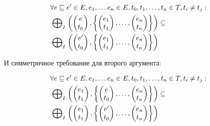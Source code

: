 \begin{equation}
\label{cpa_tm_epp_req_1}
\begin{aligned}
& \forall e \sqsubseteq e' \in E, e_1, \dots e_n \in E, t_0,t_1,\dots,t_n \in T, t_i \neq t_j : \\
& \mathrel{\bigoplus}_I
\left(
\begin{pmatrix}
e \\
t_0 
\end{pmatrix} ,
\left\{
\begin{pmatrix}
e_1 \\
t_1 
\end{pmatrix} ,
\dots ,
\begin{pmatrix}
e_n \\
t_n 
\end{pmatrix}
\right\}
\right)
\subseteq \\
&\mathrel{\bigoplus}_I
\left(
\begin{pmatrix}
e' \\
t_0 
\end{pmatrix} ,
\left\{
\begin{pmatrix}
e_1 \\
t_1 
\end{pmatrix},
\dots ,
\begin{pmatrix}
e_n \\
t_n 
\end{pmatrix}
\right\}
\right)
\end{aligned}
\end{equation}

И симметричное требование для второго аргумента:

\begin{equation}
\label{cpa_tm_epp_req_2}
\begin{aligned}
& \forall e \sqsubseteq e' \in E, e_1, \dots e_n \in E, t_0,t_1,\dots,t_n \in T, t_i \neq t_j : \\
& \mathrel{\bigoplus}_I
\left(
\begin{pmatrix}
e_1 \\
t_1 
\end{pmatrix} ,
\left\{
\begin{pmatrix}
e \\
t_0 
\end{pmatrix} ,
\dots ,
\begin{pmatrix}
e_n \\
t_n 
\end{pmatrix}
\right\}
\right)
\subseteq \\
&\mathrel{\bigoplus}_I
\left(
\begin{pmatrix}
e_1 \\
t_1 
\end{pmatrix} ,
\left\{
\begin{pmatrix}
e' \\
t_0 
\end{pmatrix},
\dots ,
\begin{pmatrix}
e_n \\
t_n 
\end{pmatrix}
\right\}
\right)
\end{aligned}
\end{equation}

